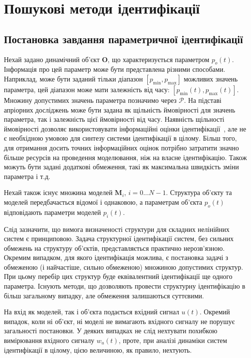 \chapter{Пошукові методи ідентифікації}

\section{Постановка завдання параметричної ідентифікації} %

Нехай задано динамічний об'єкт
$\mathbf{O}$, що характеризується параметром
$p_o(t)$\label{atu:d:p_o}. Інформація про цей параметр може бути представлена
різними способами. Наприклад, може бути заданий тільки
діапазон
$ [p_{\min}, p_{\max}] $ можливих значень параметра, цей діапазон може
мати залежність від часу:
$ [p_{\min} (t), p_{\max} (t)] $.
Множину допустимих
значень параметра позначимо через
$ \mathcal{P} $. На підставі апріорних досліджень може бути задана
як щільність ймовірності для значень параметра, так і
залежність цієї ймовірності від часу. Наявність щільності
ймовірності дозволяє використовувати інформаційні оцінки
ідентифікації~\cite{info_cipkin, atu_asau10}, але не є необхідною умовою
для синтезу системи ідентифікації в цілому. Більш того,
для отримання досить точних інформаційних оцінок потрібно
затратити значно більше ресурсів на проведення моделювання,
ніж на власне ідентифікацію. Також можуть бути задані додаткові
обмеження, такі як максимальна швидкість зміни параметра і т.д.

Нехай також існує множина моделей \label{atu:d:N}$\mathbf{M}_i$,
$ i = 0 \ldots N-1 $. Структура об'єкту та моделей передбачається відомої і
однаковою, а параметрам об'єкта
$p_o(t) $ відповідають параметри моделей
$p_{i}(t)$.

Слід зазначити, що вимога визначеності структури для складних
нелінійних систем є принциповою. Задача структурної
ідентифікації систем, без сильних обмежень на структуру
об'єктів, представляється практично нерозв'язною. Окремим
випадком, для якого ідентифікація можлива, є постановка
задачі з обмеженою (і найчастіше, сильно обмеженою) множиною
допустимих структур. При цьому перебір цих структур буде
еквівалентний ідентифікації ще одного параметра. Існують
методи, що дозволяють провести структурну ідентифікацію в
більш загальному випадку, але обмеження залишаються суттєвими.



На вхід як моделей, так і об'єкта подається вхідний сигнал
\label{atu:d:u}$u(t)$.
Окремий випадок, коли ні об'єкт, ні моделі не вимагають
вхідного сигналу не порушує загальності постановки. У деяких
випадках не слід нехтувати похибкою вимірювання вхідного
сигналу $ w_u (t) $, проте, при аналізі динаміки систем ідентифікації в
цілому, цією величиною, як правило, нехтують.

